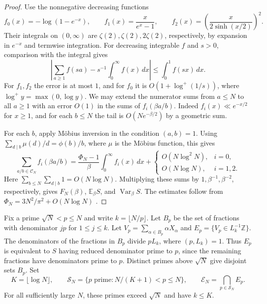 \documentclass[11pt]{amsart}
\theoremstyle{remark}
\DeclareMathOperator{\Var}{Var}
\newcommand{\Ee}{\mathbb E}
\newcommand{\Z}{\mathbb Z}
\newcommand{\CN}{\mathcal C_N}
\begin{document}
\begin{proof}
Use the nonnegative decreasing functions
\[
 f_0(x)=-\log(1-e^{-x}),\qquad
 f_1(x)=\frac{x}{e^x-1},\qquad
 f_2(x)=\left(\frac{x}{2\sinh(x/2)}\right)^2 .
\]
Their integrals on \((0,\infty)\) are \(\zeta(2),\zeta(2),2\zeta(2)\), respectively, by expansion in \(e^{-x}\) and termwise integration. For decreasing integrable \(f\) and \(s>0\), comparison with the integral gives
\[
 \left|\sum_{a\ge1} f(sa)-s^{-1}\int_0^\infty f(x)\,dx\right|
 \le \int_0^1 f(sx)\,dx .
\]
For \(f_1,f_2\) the error is at most \(1\), and for \(f_0\) it is \(O(1+\log^+(1/s))\), where \(\log^+ y=\max(0,\log y)\). We may extend the numerator sums from \(a\le N\) to all \(a\ge1\) with an error \(O(1)\) in the sums of \(f_i(\beta a/b)\). Indeed \(f_i(x)\ll e^{-x/2}\) for \(x\ge1\), and for each \(b\le N\) the tail is \(O(N e^{-\beta/2})\) by a geometric sum.

For each \(b\), apply M\"obius inversion in the condition \((a,b)=1\). Using \(\sum_{d\mid b}\mu(d)/d=\phi(b)/b\), where \(\mu\) is the M\"obius function, this gives
\[
 \sum_{a/b\in\CN} f_i(\beta a/b)
 =\frac{\Phi_N-1}{\beta}\int_0^\infty f_i(x)\,dx+
 \begin{cases}
 O(N\log^2N),&i=0,\\
 O(N\log N),&i=1,2.
 \end{cases}
\]
Here \(\sum_{b\le N}\sum_{d\mid b}1=O(N\log N)\). Multiplying these sums by \(1,\beta^{-1},\beta^{-2}\), respectively, gives \(F_N(\beta)\), \(\Ee_\beta S\), and \(\Var_\beta S\). The estimates follow from \(\Phi_N=3N^2/\pi^2+O(N\log N)\) \cite{hardy-wright}.
\end{proof}

Fix a prime \(\sqrt N<p\le N\) and write \(k=\lfloor N/p\rfloor\). Let \(B_p\) be the set of fractions with denominator \(jp\) for \(1\le j\le k\). Let \(V_p=\sum_{\alpha\in B_p}\alpha X_\alpha\) and \(E_p=\{V_p\in L_k^{-1}\Z\}\). The denominators of the fractions in \(B_p\) divide \(pL_k\), where \((p,L_k)=1\). Thus \(E_p\) is equivalent to \(S\) having reduced denominator prime to \(p\), since the remaining fractions have denominators prime to \(p\). Distinct primes above \(\sqrt N\) give disjoint sets \(B_p\). Set
\begin{equation}
 K=\lfloor\log N\rfloor,\qquad
 \mathcal S_N=\{p\text{ prime}:N/(K+1)<p\le N\},\qquad \mathcal E_N=\bigcap_{p\in\mathcal S_N} E_p .
 \label{eq:cutoff}
\end{equation}
For all sufficiently large \(N\), these primes exceed \(\sqrt N\) and have \(k\le K\).
\end{document}
